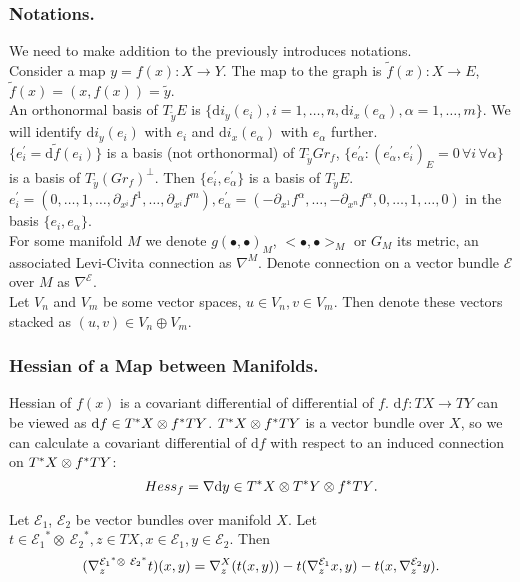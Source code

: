 \documentclass{llncs}
\newcommand{\partderiv}[2]{\partial_{#2} {#1}}
\newcommand{\CovariantDiffManif}[1]{\nabla^{#1}}
\newcommand{\CovariantDerivManif}[2]{\tensor*{\nabla}{^{#1}_{#2}}}
\newcommand{\CovariantDiff}{\nabla}
\newcommand{\Diff}{\mathrm{d}}
\newcommand{\TangentBundle}[1]{T{#1}}
\newcommand{\CotangentBundle}[1]{\tensor*{T}{^{*}}{#1}}
\newcommand {\Preimage}[2]{{#2}^*{#1}}
\newcommand \TPreimage[2]{\Preimage{\TangentBundle{#1}}{#2}}
\newcommand {\DiffSpace}[3]{\CotangentBundle{#1}\otimes \TPreimage{#2}{#3}}
\newcommand {\HessianSpace}[3]{\CotangentBundle{#1}\otimes \CotangentBundle{#2}\otimes \TPreimage{#2}{#3}}
\newcommand {\bigeps}{\mathcal{E}}
\begin{document}
\subsubsection{Notations.}
We need to make addition to the previously introduces notations.
\\
Consider a map $y = f(x):X\to Y$. The map to the graph is
$\tilde{f}(x):X \to E$, $\tilde{f}(x)=(x,f(x))=\tilde{y}$.
\\
An orthonormal basis of $T_{\tilde{y}} E$ is $\{\Diff i_y(e_i), i=1,\dots,n, 
\Diff i_x(e_\alpha),\alpha=1,\dots,m\}$. We will identify $\Diff i_y(e_i)$ with $e_i$ and $\Diff i_x(e_\alpha)$ with $e_\alpha$ further. 
\\
$\{e_i^{'}=\Diff \tilde{f}(e_i)\}$ is a basis (not orthonormal) of $T_{\tilde{y}} Gr_f$, 
$\{e_\alpha^{'}: (e_\alpha^{'},e_i^{'})_{E} = 0 \,\forall i \, \forall \alpha \}$ is a basis of $T_{\tilde{y}} (Gr_f)^{\bot}$. Then $\{e_i^{'}, e_\alpha^{'}\}$ is a basis of $T_{\tilde{y}} E$. 
\\
$e_i^{'} = (0,\dots,1, \dots, \partderiv{f^1}{x^i}, \dots, \partderiv{f^m}{x^i}), 
e_{\alpha}^{'}=(-\partderiv{f^{\alpha}}{x^1}, \dots, -\partderiv{f^{\alpha}}{x^n}, 0,\dots,1, \dots,0)$ in the basis $\{e_i, e_\alpha\}$.
\\
For some manifold $M$ we denote $g(∙,∙)_{M}$, $<∙,∙>_{M}$ or $G_M$ its metric, an associated Levi-Civita connection as $\CovariantDiffManif{M}$. Denote connection on a vector bundle $\bigeps$ over $M$ as $\CovariantDiffManif{\bigeps}$. 
\\
Let $V_n$ and $V_m$ be some vector spaces, $u \in V_n, v \in V_m$. Then denote these vectors stacked as $(u,v) \in V_n\oplus V_m$.

\subsubsection{Hessian of a Map between Manifolds.}
Hessian of $f(x)$ is a covariant differential of differential of $f$. $\Diff f:TX\to TY$ can be viewed as $\Diff f \in \DiffSpace{X}{Y}{f}$.
$\DiffSpace{X}{Y}{f}$ is a vector bundle over $X$, so we can calculate a covariant differential of $\Diff f$ with respect to an induced connection on $\DiffSpace{X}{Y}{f}$: 
\begin{equation*}Hess_f=\CovariantDiff \Diff y \in \HessianSpace{X}{Y}{f}.\end{equation*}

\begin{lemma} \label{LemCovDiff}
Let $\bigeps_1$, $\bigeps_2$ be vector bundles over manifold $X$. 
Let $t \in {\bigeps_1}^* \otimes \ {\bigeps_2}^*, z \in TX, x \in \bigeps_1, y \in \bigeps_2$.
Then
\begin{equation*}(\CovariantDerivManif{{\bigeps_1}^* \otimes \ {\bigeps_2}^*}{z}{t})(x, y) = 
\CovariantDerivManif{X}{z}{(t(x, y))} -
t(\CovariantDerivManif{\bigeps_1}{z}{x}, y) - 
t(x, \CovariantDerivManif{\bigeps_2}{z}{y}).\end{equation*}
\end{lemma}
\end{document}
